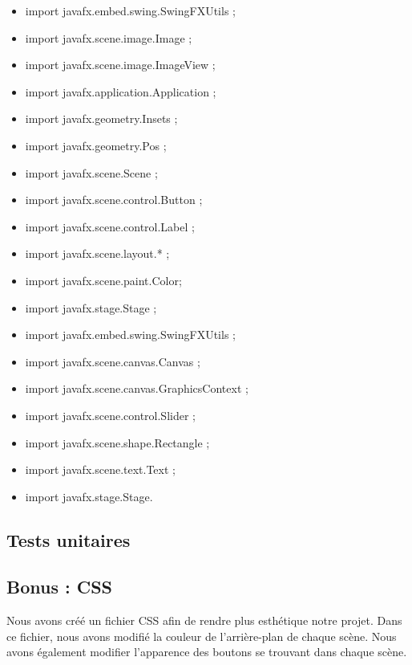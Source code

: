 \begin{itemize}
	\item import javafx.embed.swing.SwingFXUtils ;
	\item import javafx.scene.image.Image ;
	\item import javafx.scene.image.ImageView ;
	\item import javafx.application.Application ;
	\item import javafx.geometry.Insets ;
	\item import javafx.geometry.Pos ;
	\item import javafx.scene.Scene ;
	\item import javafx.scene.control.Button ;
	\item import javafx.scene.control.Label ;
	\item import javafx.scene.layout.* ;
	\item import javafx.scene.paint.Color;
	\item import javafx.stage.Stage ;
	\item import javafx.embed.swing.SwingFXUtils ;
	\item import javafx.scene.canvas.Canvas ;
	\item import javafx.scene.canvas.GraphicsContext ;
	\item import javafx.scene.control.Slider ;
	\item import javafx.scene.shape.Rectangle ;
	\item import javafx.scene.text.Text ;
	\item import javafx.stage.Stage.
\end{itemize}



\subsection{Tests unitaires}

\subsection{Bonus : CSS}

Nous avons créé un fichier CSS afin de rendre plus esthétique notre projet. Dans ce fichier, nous avons modifié la couleur de l'arrière-plan de chaque scène. Nous avons également modifier l'apparence des boutons se trouvant dans chaque scène.






